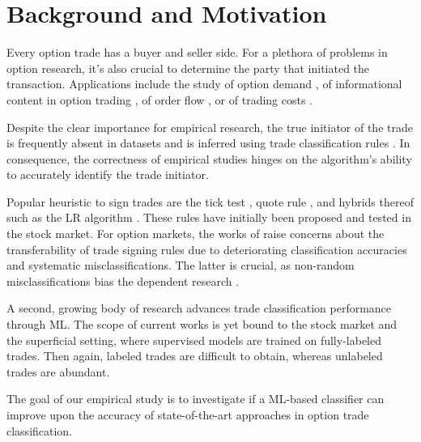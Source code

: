 

\section{Background and Motivation}

Every option trade has a buyer and seller side. For a plethora of problems in option research, it’s also crucial to determine the party that initiated the transaction. Applications include the study of option demand \autocite[][]{garleanuDemandBasedOptionPricing2009}, of informational content in option trading \autocites[][]{huDoesOptionTrading2014}[][]{panInformationOptionVolume2006}[][]{caoInformationalContentOption2005}, of order flow \autocite[][]{muravyevOrderFlowExpected2016}, or of trading costs \autocite[][]{muravyevOptionsTradingCosts2020}. 

Despite the clear importance for empirical research, the true initiator of the trade is frequently absent in datasets and is inferred using trade classification rules \autocite[][]{easleyOptionVolumeStock1998}. In consequence, the correctness of empirical studies hinges on the algorithm's ability to accurately identify the trade initiator.

Popular heuristic to sign trades are the tick test \autocite[][]{hasbrouckTradesQuotesInventories1988}, quote rule \autocite[][]{harrisDayEndTransactionPrice1989}, and hybrids thereof such as the \gls{LR} algorithm \autocite[][]{leeInferringTradeDirection1991}. These rules have initially been proposed and tested in the stock market. For option markets, the works of \textcites[][]{savickasInferringDirectionOption2003}[][]{grauerOptionTradeClassification2022} raise concerns about the transferability of trade signing rules due to deteriorating classification accuracies and systematic misclassifications. The latter is crucial, as non-random misclassifications bias the dependent research \autocites[][]{odders-whiteOccurrenceConsequencesInaccurate2000}[][]{theissenTestAccuracyLee2001}.

A second, growing body of research \autocites{blazejewskiLocalNonParametricModel2005}{rosenthalModelingTradeDirection2012}{ronenMachineLearningTrade2022} advances trade classification performance through \gls{ML}. The scope of current works is yet bound to the stock market and the superficial setting, where supervised models are trained on fully-labeled trades. Then again, labeled trades are difficult to obtain, whereas unlabeled trades are abundant.

The goal of our empirical study is to investigate if a \gls{ML}-based classifier can improve upon the accuracy of state-of-the-art approaches in option trade classification.

